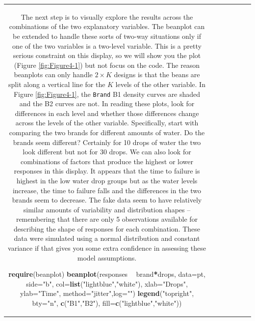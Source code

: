 \documentclass[]{book}
\newenvironment{Shaded}{\begin{snugshade}}{\end{snugshade}}
\newcommand{\KeywordTok}[1]{\textcolor[rgb]{0.13,0.29,0.53}{\textbf{#1}}}
\newcommand{\DataTypeTok}[1]{\textcolor[rgb]{0.13,0.29,0.53}{#1}}
\newcommand{\StringTok}[1]{\textcolor[rgb]{0.31,0.60,0.02}{#1}}
\newcommand{\OperatorTok}[1]{\textcolor[rgb]{0.81,0.36,0.00}{\textbf{#1}}}
\newcommand{\NormalTok}[1]{#1}
\theoremstyle{definition}
\theoremstyle{definition}
\theoremstyle{remark}
\begin{document}
\begin{longtable}[]{@{}ccccccc@{}}
\begin{minipage}[b]{0.10\columnwidth}
The next step is to visually explore the results across the combinations
of the two explanatory variables. The beanplot can be extended to handle
these sorts of two-way situations only if one of the two variables is a
two-level variable. This is a pretty serious constraint on this display,
so we will show you the plot (Figure \ref{fig:Figure4-1}) but not focus
on the code. The reason beanplots can only handle \(2 \times K\) designs
is that the beans are split along a vertical line for the \(K\) levels
of the other variable. In Figure \ref{fig:Figure4-1}, the \texttt{Brand}
B1 density curves are shaded and the B2 curves are not. In reading these
plots, look for differences in each level and whether those differences
change across the levels of the other variable. Specifically, start with
comparing the two brands for different amounts of water. Do the brands
seem different? Certainly for 10 drops of water the two look different
but not for 30 drops. We can also look for combinations of factors that
produce the highest or lower responses in this display. It appears that
the time to failure is highest in the low water drop groups but as the
water levels increase, the time to failure falls and the differences in
the two brands seem to decrease. The fake data seem to have relatively
similar amounts of variability and distribution shapes -- remembering
that there are only 5 observations available for describing the shape of
responses for each combination. These data were simulated using a normal
distribution and constant variance if that gives you some extra
confidence in assessing these model assumptions.




\begin{Shaded}
\begin{Highlighting}[]
\KeywordTok{require}\NormalTok{(beanplot)}
\KeywordTok{beanplot}\NormalTok{(responses }\OperatorTok{~}\StringTok{ }\NormalTok{brand}\OperatorTok{*}\NormalTok{drops, }\DataTypeTok{data=}\NormalTok{pt, }\DataTypeTok{side=}\StringTok{"b"}\NormalTok{, }\DataTypeTok{col=}\KeywordTok{list}\NormalTok{(}\StringTok{"lightblue"}\NormalTok{,}\StringTok{"white"}\NormalTok{),}
         \DataTypeTok{xlab=}\StringTok{"Drops"}\NormalTok{, }\DataTypeTok{ylab=}\StringTok{"Time"}\NormalTok{, }\DataTypeTok{method=}\StringTok{"jitter"}\NormalTok{,}\DataTypeTok{log=}\StringTok{""}\NormalTok{)}
\KeywordTok{legend}\NormalTok{(}\StringTok{"topright"}\NormalTok{, }\DataTypeTok{bty=}\StringTok{"n"}\NormalTok{, }\KeywordTok{c}\NormalTok{(}\StringTok{"B1"}\NormalTok{,}\StringTok{"B2"}\NormalTok{), }\DataTypeTok{fill=}\KeywordTok{c}\NormalTok{(}\StringTok{"lightblue"}\NormalTok{,}\StringTok{"white"}\NormalTok{))}
\end{Highlighting}
\end{Shaded}


\end{minipage}
\end{longtable}
\end{document}
